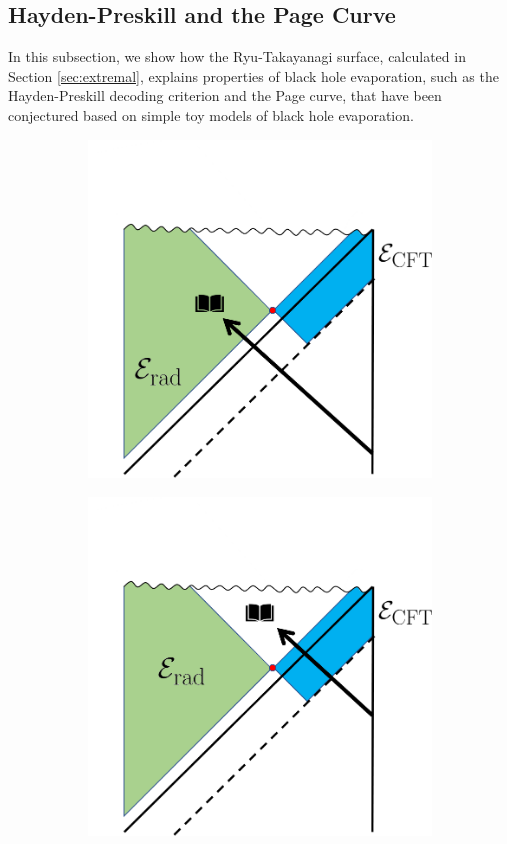 \documentclass[11pt,a4paper]{article}
\begin{document}
\subsection{Hayden-Preskill and the Page Curve} \label{sec:haydenpage}
In this subsection, we show how the Ryu-Takayanagi surface, calculated in Section \ref{sec:extremal}, explains properties of black hole evaporation, such as the Hayden-Preskill decoding criterion and the Page curve, that have been conjectured based on simple toy models of black hole evaporation.
\begin{figure}[t]
\vspace{-1cm}
\begin{subfigure}{.48\textwidth}
\includegraphics[width = 0.8\linewidth]{HaydenPreskill.png}
\centering
\end{subfigure}
\begin{subfigure}{.48\textwidth}
\includegraphics[width = 0.8\linewidth]{HaydenPreskillLate.png}
\centering
\end{subfigure}


\end{figure}
\end{document}
